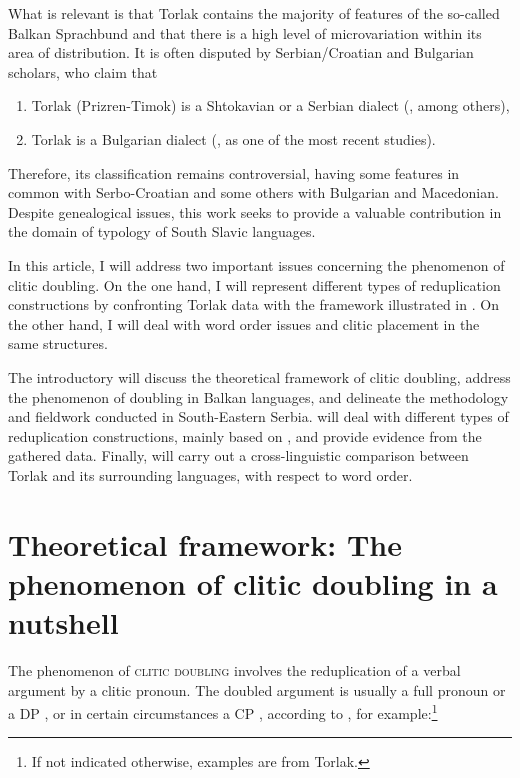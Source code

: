 \documentclass[output=paper,
colorlinks,
citecolor=brown,
newtxmath
]{langscibook}
\begin{document}
What is relevant is that Torlak contains the majority of features of the so-called Balkan Sprachbund and that there is a high level of microvariation within its area of distribution. It is often disputed by Serbian/Croatian and Bulgarian scholars, who claim that

\begin{enumerate}
\item Torlak (Prizren-Timok) is a Shtokavian or a Serbian dialect (\citealt{Belic1905,Ivic1956,Brozovic.Ivic1988}, among others),
\item Torlak is a Bulgarian dialect (\citealt{Stoykov2002}, as one of the most recent studies).
\end{enumerate}

Therefore, its classification remains controversial, having some features in common with Serbo-Croatian and some others with Bulgarian and Macedonian. Despite genealogical issues, this work seeks to provide a valuable contribution in the domain of typology of South Slavic languages.


In this article, I will address two important issues concerning the phenomenon of clitic doubling. On the one hand, I will represent different types of reduplication constructions by confronting Torlak data with the framework illustrated in \citet{Cinque.Krapova2008}. On the other hand, I will deal with word order issues and clitic placement in the same structures.

The introductory   will discuss the theoretical framework of clitic doubling, address the phenomenon of doubling in Balkan languages, and delineate the methodology and fieldwork conducted in South-Eastern Serbia.  will deal with different types of reduplication constructions, mainly based on \citet{Cinque.Krapova2008}, and provide evidence from the gathered data. Finally,  will carry out a cross-linguistic comparison between Torlak and its surrounding languages, with respect to word order.


\section{Theoretical framework: The phenomenon of clitic doubling in a nutshell}\label{sec:framework}
The phenomenon of \textsc{clitic doubling} involves the reduplication of a verbal argument by a clitic pronoun. The doubled argument is usually a full pronoun  or a DP , or in certain circumstances a CP , according to \citet[1--4]{Kallulli.Tasmowski2008}, for example:\footnote{If not indicated otherwise, examples are from Torlak.}
\end{document}
